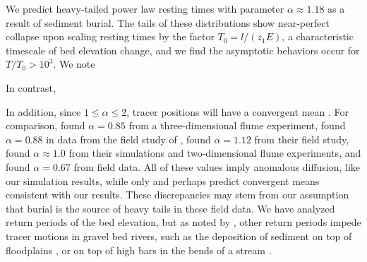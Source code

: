 \documentclass[draft]{agujournal2018}
\begin{document}
We predict heavy-tailed power law resting times with parameter $\alpha \approx 1.18$ as a result of sediment burial.
The tails of these distributions show near-perfect collapse upon scaling resting times by the factor $T_0 = l/(z_1 E)$, a characteristic timescale of bed elevation change, and we find the asymptotic behaviors occur for $T/T_0>10^3$.
We note 


In contrast, \citet{Martin2014} 



In addition, since $1 \leq \alpha \leq 2$, tracer positions will have a convergent mean \citep[e.g.][]{Weeks1998, Bradley2017}.
For comparison, \citet{Martin2012} found $\alpha = 0.85$ from a three-dimensional flume experiment,  \citet{Voepel2013} found $\alpha = 0.88$ in data from the field study of \citet{Habersack2001},
\citet{Phillips2013} found $\alpha = 1.12$ from their field study, \citet{Martin2014} found $\alpha \approx 1.0$ from their simulations and two-dimensional flume experiments, and \citet{Bradley2017} found $\alpha = 0.67$ from field data. 
All of these values imply anomalous diffusion, like our simulation results, while only \citet{Phillips2013} and perhaps \citet{Martin2014} predict convergent means consistent with our results.
These discrepancies may stem from our assumption that burial is the source of heavy tails in these field data. 
We have analyzed return periods of the bed elevation, but as noted by \citet{Bradley2017}, 
other return periods impede tracer motions in gravel bed rivers, such as the deposition of sediment on top of floodplains \citep[e.g.][]{Bradley2013}, or on top of high bars in the bends of a stream \citep[e.g.][]{Bradley2017}.


























\end{document}
